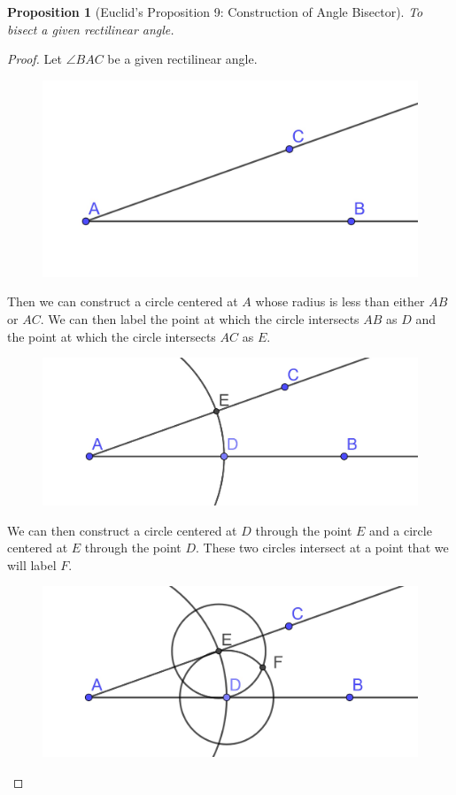 \documentclass[
]{book}
\newtheorem{proposition}{Proposition}[chapter]
\theoremstyle{definition}
\theoremstyle{definition}
\theoremstyle{definition}
\theoremstyle{definition}
\theoremstyle{remark}
\begin{document}
\begin{proposition}[Euclid's Proposition 9: Construction of Angle Bisector]
\protect\hypertarget{prp:prop9}{}\label{prp:prop9}To bisect a given rectilinear angle.
\end{proposition}

\begin{proof}
Let \(\angle BAC\) be a given rectilinear angle.

\begin{figure}

{\centering \includegraphics[width=0.4\linewidth]{images/Prop9a} 

}

\end{figure}

Then we can construct a circle centered at \(A\) whose radius is less than either \(AB\) or \(AC\). We can then label the point at which the circle intersects \(AB\) as \(D\) and the point at which the circle intersects \(AC\) as \(E\).

\begin{figure}

{\centering \includegraphics[width=0.4\linewidth]{images/Prop9b} 

}

\end{figure}

We can then construct a circle centered at \(D\) through the point \(E\) and a circle centered at \(E\) through the point \(D\). These two circles intersect at a point that we will label \(F\).

\begin{figure}

{\centering \includegraphics[width=0.4\linewidth]{images/Prop9c} 

}
\end{figure}
\end{proof}
\end{document}

